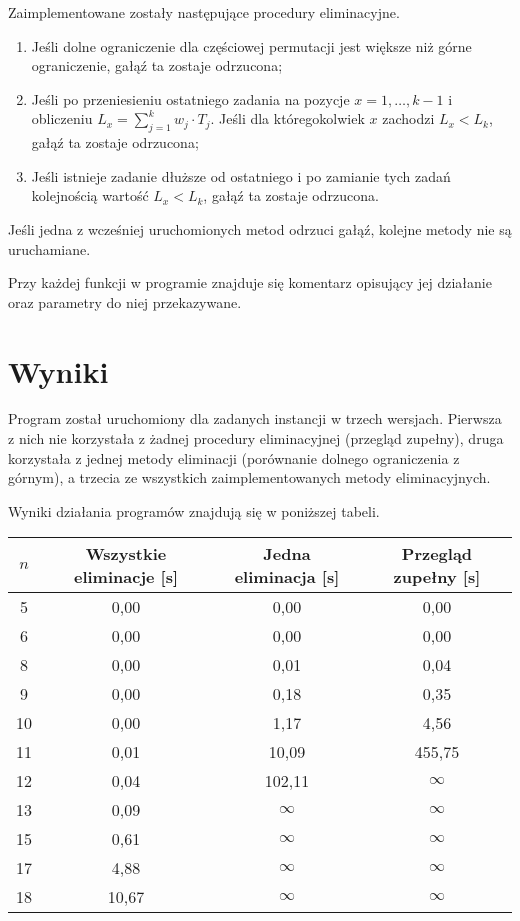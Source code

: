   Zaimplementowane zostały następujące procedury eliminacyjne.
  \begin{enumerate}
    \item Jeśli dolne ograniczenie dla częściowej permutacji jest większe niż
          górne ograniczenie, gałąź ta zostaje odrzucona;
    \item Jeśli po przeniesieniu ostatniego zadania na pozycje $x = 1,\ldots,k-1$
          i obliczeniu $L_x = \sum_{j=1}^{k} w_j \cdot T_j$. Jeśli dla
          któregokolwiek $x$ zachodzi $L_x < L_k$, gałąź ta zostaje odrzucona;
    \item Jeśli istnieje zadanie dłuższe od ostatniego i po zamianie tych zadań
          kolejnością wartość $L_x < L_k$, gałąź ta zostaje odrzucona.
  \end{enumerate}

  Jeśli jedna z wcześniej uruchomionych metod odrzuci gałąź, kolejne metody nie
  są uruchamiane.
  \vspace{1em}

  Przy każdej funkcji w programie znajduje się komentarz opisujący jej działanie
  oraz parametry do niej przekazywane.

\section{Wyniki} %
  \label{sec:wyniki}

  Program został uruchomiony dla zadanych instancji w trzech wersjach.
  Pierwsza z nich nie korzystała z żadnej procedury eliminacyjnej (przegląd
  zupełny), druga korzystała z jednej metody eliminacji (porównanie dolnego
  ograniczenia z górnym), a trzecia ze wszystkich zaimplementowanych metody
  eliminacyjnych.
  \vspace{1em}

  Wyniki działania programów znajdują się w poniższej tabeli.

  \begin{center}
    \begin{tabular}{|c|c|c|c|}
      \hline
      $n$ & Wszystkie eliminacje [s] & Jedna eliminacja [s] & Przegląd zupełny [s]\\
      \hline
      5 & 0,00 & 0,00 & 0,00 \\
      6 & 0,00 & 0,00 & 0,00 \\
      8 & 0,00 & 0,01 & 0,04 \\
      9 & 0,00 & 0,18 & 0,35 \\
      10 & 0,00 & 1,17 & 4,56 \\
      11 & 0,01 & 10,09 & 455,75 \\
      12 & 0,04 & 102,11 & $\infty$ \\
      13 & 0,09 & $\infty$ & $\infty$ \\
      15 & 0,61 & $\infty$ & $\infty$ \\
      17 & 4,88 & $\infty$ & $\infty$ \\
      18 & 10,67 & $\infty$ & $\infty$ \\
      \hline
    \end{tabular}
  \end{center}

